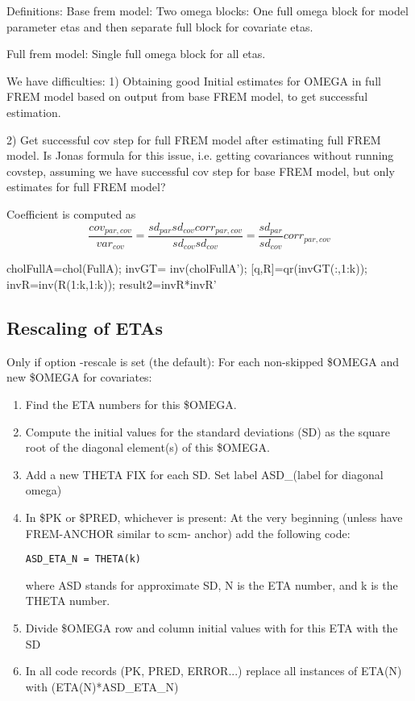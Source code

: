 Definitions:
Base frem model: Two omega blocks: One full omega block for model parameter etas and then separate full block for
covariate etas.

Full frem model: Single full omega block for all etas.

We have difficulties:
1) Obtaining good Initial estimates for OMEGA in full FREM model based on output from base FREM model,
to get successful estimation.

2) Get successful cov step for full FREM model after estimating full FREM model.
Is Jonas formula for this issue, i.e. getting covariances without running covstep, assuming we have
successful cov step for base FREM model, but only estimates for full FREM model?


Coefficient is computed as
\[
\frac{cov_{par,cov}}{var_{cov}}=\frac{sd_{par}sd_{cov}corr_{par,cov}}{sd_{cov}sd_{cov}}=\frac{sd_{par}}{sd_{cov}}corr_{par,cov}
\]



  cholFullA=chol(FullA);
invGT=  inv(cholFullA'); %
[q,R]=qr(invGT(:,1:k));
invR=inv(R(1:k,1:k));
result2=invR*invR'

\subsection{Rescaling of ETAs}
Only if option -rescale is set (the default):
For each non-skipped \$OMEGA and new \$OMEGA for covariates:
\begin{enumerate}
\item Find the ETA numbers for this \$OMEGA.
\item Compute the initial values for the standard deviations (SD) as the square root of the diagonal
element(s) of this \$OMEGA.
\item Add a new THETA FIX for each SD. Set label ASD\_(label for diagonal omega)
\item In \$PK or \$PRED, whichever is present:
At the very beginning (unless have FREM-ANCHOR similar to scm- anchor) add the following code: \\
\begin{verbatim}
ASD_ETA_N = THETA(k)
\end{verbatim}
where ASD stands for approximate SD, N is the ETA number, and k is the THETA number.
\item Divide \$OMEGA row and column initial values with for this ETA with the SD
\item In all code records (PK, PRED, ERROR...) replace all instances of ETA(N) with (ETA(N)*ASD\_ETA\_N)
\end{enumerate}
